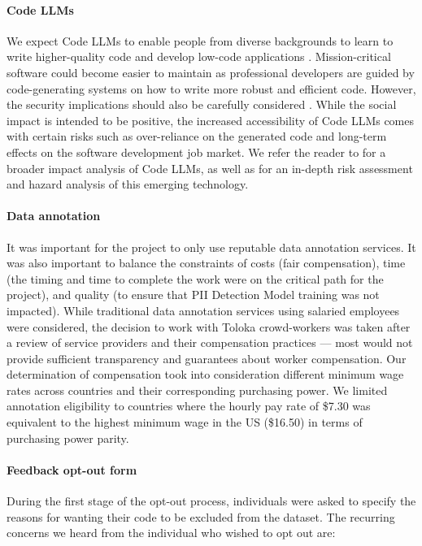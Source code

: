 \paragraph{Code LLMs} We expect Code LLMs to enable people from diverse backgrounds to learn to write higher-quality code and develop low-code applications \citep{leinonen2023comparing}. Mission-critical software could become easier to maintain as professional developers are guided by code-generating systems on how to write more robust and efficient code. However, the security implications should also be carefully considered \citep{sandoval2023lost}. While the social impact is intended to be positive, the increased accessibility of Code LLMs comes with certain risks such as over-reliance on the generated code and long-term effects on the software development job market. We refer the reader to \citet[Section 7]{chen2021codex} for a broader impact analysis of Code LLMs, as well as \citet{khlaaf2022hazard} for an in-depth risk assessment and hazard analysis of this emerging technology.

\paragraph{Data annotation} It was important for the project to only use reputable data annotation services. It was also important to balance the constraints of costs (fair compensation), time (the timing and time to complete the work were on the critical path for the project), and quality (to ensure that PII Detection Model training was not impacted). While traditional data annotation services using salaried employees were considered, the decision to work with Toloka crowd-workers was taken after a review of service providers and their compensation practices --- most would not provide sufficient transparency and guarantees about worker compensation. Our determination of compensation took into consideration different minimum wage rates across countries and their corresponding purchasing power. We limited annotation eligibility to countries where the hourly pay rate of \$7.30 was equivalent to the highest minimum wage in the US (\$16.50) in terms of purchasing power parity. 

\paragraph{Feedback opt-out form} During the first stage of the opt-out process, individuals were asked to specify the reasons for wanting their code to be excluded from the dataset. The recurring concerns we heard from the individual who wished to opt out are:

